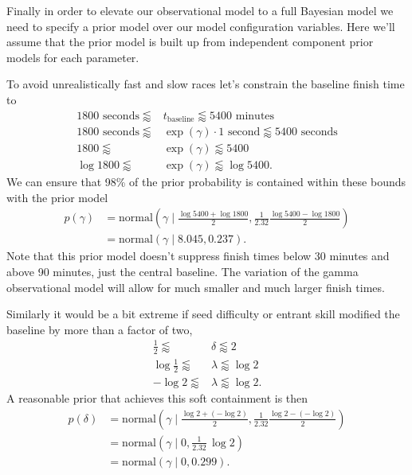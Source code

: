 \documentclass[
  letterpaper,
  DIV=11,
  numbers=noendperiod]{scrartcl}
\begin{document}
Finally in order to elevate our observational model to a full Bayesian
model we need to specify a prior model over our model configuration
variables. Here we'll assume that the prior model is built up from
independent component prior models for each parameter.

To avoid unrealistically fast and slow races let's constrain the
baseline finish time to \begin{align*}
1800 \text{ seconds} \lessapprox
&t_{\mathrm{baseline}} \lessapprox
5400 \text{ minutes}
\\
1800 \text{ seconds} \lessapprox
&\exp(\gamma) \cdot 1 \text{ second} \lessapprox
5400 \text{ seconds}
\\
1800 \lessapprox
&\exp(\gamma) \lessapprox
5400
\\
\log 1800 \lessapprox
&\exp(\gamma) \lessapprox
\log 5400.
\end{align*} We can ensure that 98\% of the prior probability is
contained within these bounds with the prior model \begin{align*}
p( \gamma )
&=
\text{normal} \left(
\gamma \mid \frac{\log 5400 + \log 1800}{2},
            \frac{1}{2.32} \frac{\log 5400 - \log 1800}{2} \right)
\\
&= \text{normal}( \gamma \mid 8.045, 0.237).
\end{align*} Note that this prior model doesn't suppress finish times
below 30 minutes and above 90 minutes, just the central baseline. The
variation of the gamma observational model will allow for much smaller
and much larger finish times.

Similarly it would be a bit extreme if seed difficulty or entrant skill
modified the baseline by more than a factor of two, \begin{align*}
\frac{1}{2} \lessapprox &\delta \lessapprox 2
\\
\log \frac{1}{2} \lessapprox &\lambda \lessapprox \log 2
\\
- \log 2 \lessapprox &\lambda \lessapprox \log 2.
\end{align*} A reasonable prior that achieves this soft containment is
then \begin{align*}
p( \delta )
&=
\text{normal} \left(
\gamma \mid \frac{\log 2 + (-\log 2)}{2},
            \frac{1}{2.32} \frac{\log 2 - (-\log 2)}{2} \right)
\\
&=
\text{normal} \left(
\gamma \mid 0, \frac{1}{2.32} \, \log 2\right)
\\
&= \text{normal}( \gamma \mid 0, 0.299).
\end{align*}
\end{document}
